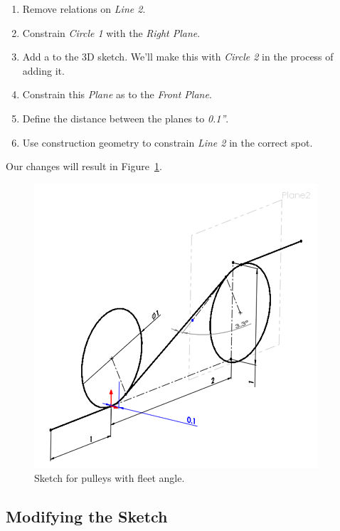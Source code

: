 \begin{enumerate}
\item{} Remove  relations on \emph{Line 2}.
\item{} Constrain \emph{Circle 1}  with the \emph{Right Plane}.
\item{} Add a   to the 3D sketch. We'll make this  with
\emph{Circle 2} in the process of adding it.
\item{} Constrain this \emph{Plane} as  to the \emph{Front Plane}.
\item{} Define the distance between the planes to \emph{0.1''}.
\item{} Use construction geometry to constrain \emph{Line 2} in the correct spot.
\end{enumerate}

Our changes will result in Figure~\ref{fig:non-tangential-3d-sketch}.

\begin{figure}[H]
\begin{center}
\includegraphics{images/figures/non-tangential-3d-sketch.png}
\end{center}
\caption{Sketch for pulleys with fleet angle.
\label{fig:non-tangential-3d-sketch}}

\end{figure}

\subsection{Modifying the Sketch}

